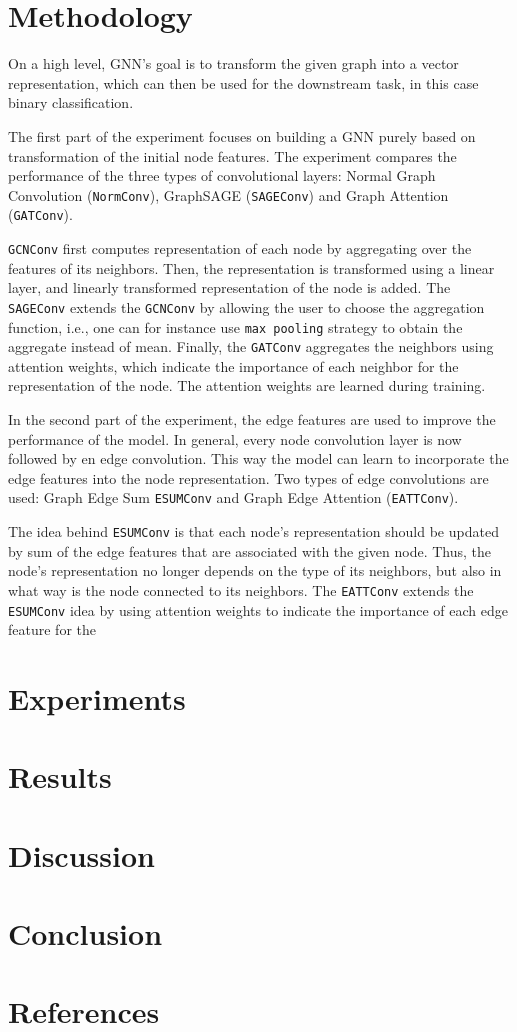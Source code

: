 \documentclass[10pt,twocolumn]{article}
\begin{document}
\section{Methodology}\label{sec:methodology}
On a high level, GNN's goal is to transform the given
graph into a vector representation, which can then be used
for the downstream task, in this case binary classification.

The first part of the experiment focuses on building a GNN purely
based on transformation of the initial node features. The experiment compares the performance of the
three types of convolutional layers: Normal Graph Convolution (\texttt{NormConv}), 
GraphSAGE (\texttt{SAGEConv}) and Graph Attention (\texttt{GATConv}).

\texttt{GCNConv} first computes representation of each node by aggregating
over the features of its neighbors. Then, the representation is transformed
using a linear layer, and linearly transformed representation of the node is added.
The \texttt{SAGEConv} extends the \texttt{GCNConv} by allowing the user to 
choose the aggregation function, i.e., one can for instance use \texttt{max pooling}
strategy to obtain the aggregate instead of mean. Finally, the \texttt{GATConv} aggregates
the neighbors using attention weights, which indicate the importance of each neighbor 
for the representation of the node. The attention weights are learned during training.

In the second part of the experiment, the edge features are used to improve the performance
of the model. In general, every node convolution layer is now followed by en edge convolution.
This way the model can learn to incorporate the edge features into the node representation.
Two types of edge convolutions are used: Graph Edge Sum \texttt{ESUMConv} and Graph Edge Attention
(\texttt{EATTConv}).

The idea behind \texttt{ESUMConv} is that each node's representation should be updated 
by sum of the edge features that are associated with the given node. Thus, the node's
representation no longer depends on the type of its neighbors, but also in what way 
is the node connected to its neighbors. The \texttt{EATTConv} extends the \texttt{ESUMConv}
idea by using attention weights to indicate the importance of each edge feature for the

\section{Experiments}\label{sec:experiments}


\section{Results}

\section{Discussion}

\section{Conclusion}

\newpage
\section{References}


\end{document}
